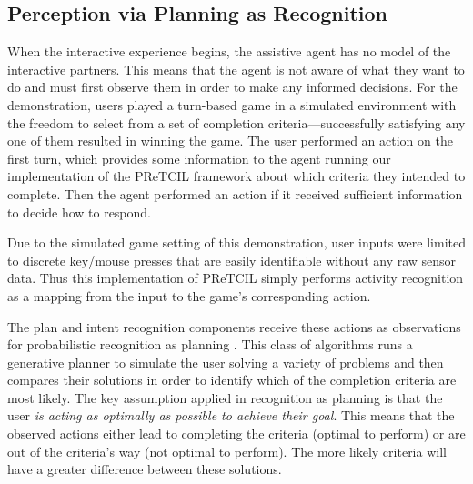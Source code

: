 \documentclass[letterpaper]{article} %
\begin{document}
\subsection{Perception via Planning as Recognition\label{sec:pretcil.perception}}
When the interactive experience begins, the assistive agent has no model of the interactive partners.  This means that the agent is not aware of what they want to do and must first observe them in order to make any informed decisions.  For the demonstration, users played a turn-based game in a simulated environment with the freedom to select from a set of completion criteria---successfully satisfying any one of them resulted in winning the game.  The user performed an action on the first turn, which provides some information to the agent running our implementation of the {\sc PReTCIL} framework about which criteria they intended to complete.  Then the agent performed an action if it received sufficient information to decide how to respond. %

Due to the simulated game setting of this demonstration, user inputs were limited to discrete key/mouse %
 presses that are easily identifiable without any raw sensor data.  Thus this implementation of {\sc PReTCIL}
 simply performs activity recognition as a mapping from the input to the game's corresponding action.

The plan and intent recognition components receive these actions as observations for probabilistic recognition as planning \cite{DBLP:conf/aaai/RamirezG10}.  This class of algorithms runs a generative planner to simulate the user solving a variety of problems and then compares their solutions in order to identify which of the completion criteria are most likely.  The key assumption applied in recognition as planning is that the user \textit{is acting as optimally as possible to achieve their goal}.  This means that %
the observed actions either lead to completing the criteria (optimal to perform) or are out of the criteria's way (not optimal to perform).  The more likely criteria will have a greater difference between these solutions. %
\end{document}
